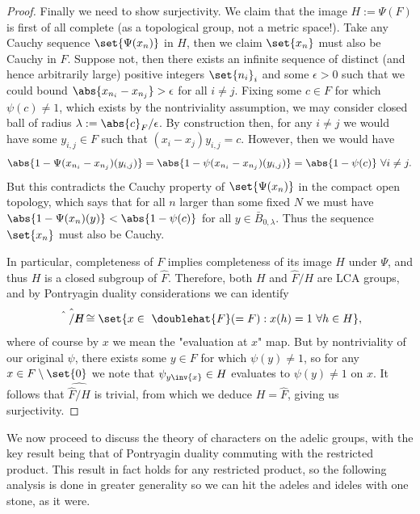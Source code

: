 \documentclass[11pt, x11names, openany]{book}
\begin{document}
\begin{proof}
Finally we need to show surjectivity. We claim that the image $H := \Psi(F)$ is first of all complete (as a topological group, not a metric space!). Take any Cauchy sequence $\set{\Psi(x_n)}$ in $H$, then we claim $\set{x_n}$ must also be Cauchy in $F$. Suppose not, then there exists an infinite sequence of distinct (and hence arbitrarily large) positive integers $\set{n_i}_i$ and some $\epsilon > 0$ such that we could bound $\abs{x_{n_i} - x_{n_j}} > \epsilon$ for all $i \neq j$. Fixing some $c \in F$ for which $\psi(c) \neq 1$, which exists by the nontriviality assumption, we may consider closed ball of radius $\lambda := \abs{c}_F/\epsilon$. By construction then, for any $i \neq j$ we would have some $y_{i, j} \in F$ such that $(x_i - x_j) y_{i, j} = c$. However, then we would have
\begin{equation*}
    \abs{1 - \Psi(x_{n_i} - x_{n_j})(y_{i, j})} = \abs{1 - \psi(x_{n_i} - x_{n_j})(y_{i, j})} = \abs{1 - \psi(c)}  \ \forall i \neq j.
\end{equation*}
But this contradicts the Cauchy property of $\set{\Psi(x_n)}$ in the compact open topology, which says that for all $n$ larger than some fixed $N$ we must have $\abs{1 - \Psi(x_n)(y)} <  \abs{1 - \psi(c)}$ for all $y \in \bar{B}_{0, \lambda}$. Thus the sequence $\set{x_n}$ must also be Cauchy. 

In particular, completeness of $F$ implies completeness of its image $H$ under $\Psi$, and thus $H$ is a closed subgroup of $\hat{F}$. Therefore, both $H$ and $\hat{F}/ H$ are LCA groups, and by Pontryagin duality considerations we can identify 
\begin{equation*}
    \hat{\hat{F}/H} \cong \set{x \in \ \doublehat{F} (= F) : x(h) = 1 \ \forall h \in H },
\end{equation*}
where of course by $x$ we mean the "evaluation at $x$" map. But by nontriviality of our original $\psi$, there exists some $y \in F$ for which $\psi(y) \neq 1$, so for any $x \in F \setminus \set{0}$ we note that $\psi_{y \inv{x}} \in H$ evaluates to $\psi(y) \neq 1$ on $x$. It follows that $\hat{\hat{F}/H}$ is trivial, from which we deduce $H = \hat{F}$, giving us surjectivity.
\end{proof}



We now proceed to discuss the theory of characters on the adelic groups, with the key result being that of Pontryagin duality commuting with the restricted product. This result in fact holds for any restricted product, so the following analysis is done in greater generality so we can hit the adeles and ideles with one stone, as it were.
\end{document}
